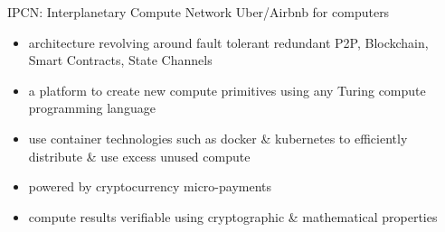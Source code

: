\begin{frame}[t]{IPCN: Interplanetary Compute Network}
	 Uber/Airbnb for computers
 \begin{itemize}
 \item architecture revolving around fault tolerant redundant P2P, Blockchain, Smart Contracts, State Channels
 \item a platform to create new compute primitives using any Turing compute programming language
 \item use container technologies such as docker \& kubernetes to efficiently distribute \& use excess unused compute
 \item powered by cryptocurrency micro-payments
 \item compute results verifiable using cryptographic \& mathematical properties
 \end{itemize}
\end{frame}